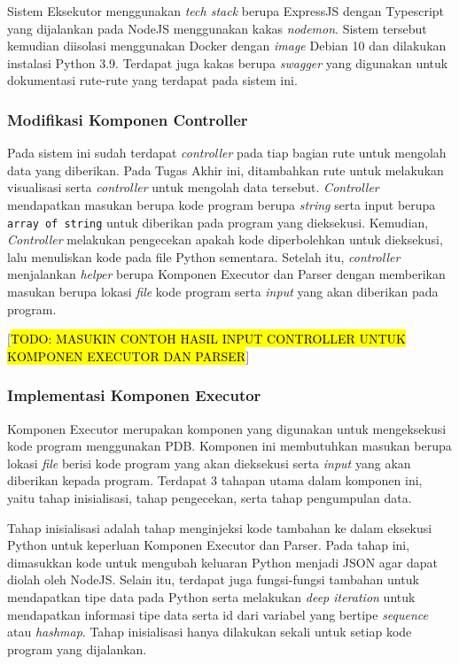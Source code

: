 Sistem Eksekutor menggunakan \textit{tech stack} berupa ExpressJS dengan Typescript yang dijalankan pada NodeJS menggunakan kakas \textit{nodemon}. Sistem tersebut kemudian diisolasi menggunakan Docker dengan \textit{image} Debian 10 dan dilakukan instalasi Python 3.9. Terdapat juga kakas berupa \textit{swagger} yang digunakan untuk dokumentasi rute-rute yang terdapat pada sistem ini.

\subsubsection{Modifikasi Komponen Controller}
Pada sistem ini sudah terdapat \textit{controller} pada tiap bagian rute untuk mengolah data yang diberikan. Pada Tugas Akhir ini, ditambahkan rute untuk melakukan visualisasi serta \textit{controller} untuk mengolah data tersebut. \textit{Controller} mendapatkan masukan berupa kode program berupa \textit{string} serta input berupa \verb|array of string| untuk diberikan pada program yang dieksekusi. Kemudian, \textit{Controller} melakukan pengecekan apakah kode diperbolehkan untuk dieksekusi, lalu menuliskan kode pada file Python sementara. Setelah itu, \textit{controller} menjalankan \textit{helper} berupa Komponen Executor dan Parser dengan memberikan masukan berupa lokasi \textit{file} kode program serta \textit{input} yang akan diberikan pada program.

  [\hl{TODO: MASUKIN CONTOH HASIL INPUT CONTROLLER UNTUK KOMPONEN EXECUTOR DAN PARSER}]

\subsubsection{Implementasi Komponen Executor}
Komponen Executor merupakan komponen yang digunakan untuk mengeksekusi kode program menggunakan PDB. Komponen ini membutuhkan masukan berupa lokasi \textit{file} berisi kode program yang akan dieksekusi serta \textit{input} yang akan diberikan kepada program. Terdapat 3 tahapan utama dalam komponen ini, yaitu tahap inisialisasi, tahap pengecekan, serta tahap pengumpulan data.

Tahap inisialisasi adalah tahap menginjeksi kode tambahan ke dalam eksekusi Python untuk keperluan Komponen Executor dan Parser. Pada tahap ini, dimasukkan kode untuk mengubah keluaran Python menjadi JSON agar dapat diolah oleh NodeJS. Selain itu, terdapat juga fungsi-fungsi tambahan untuk mendapatkan tipe data pada Python serta melakukan \textit{deep iteration} untuk mendapatkan informasi tipe data serta id dari variabel yang bertipe \textit{sequence} atau \textit{hashmap}. Tahap inisialisasi hanya dilakukan sekali untuk setiap kode program yang dijalankan.

